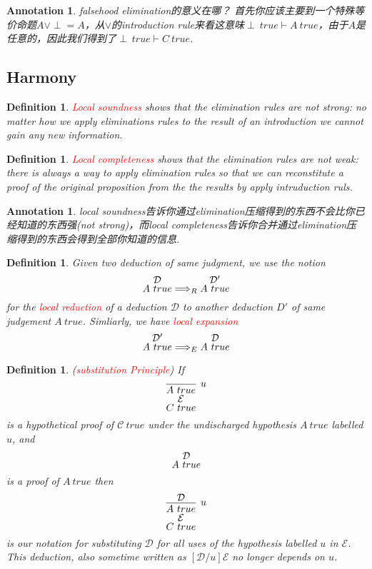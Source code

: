 \documentclass{article}
\theoremstyle{plain}
\newtheorem{definition}[theorem]{Definition}
\newtheorem{annotation}[theorem]{Annotation}
\theoremstyle{nonumberplain}
\newcommand{\redt}[1]{\textcolor{red}{#1}}
\begin{document}
\begin{annotation}
\rm falsehood elimination的意义在哪？ 首先你应该主要到一个特殊等价命题$A \vee \perp = A$，从$\vee$的introduction rule来看这意味$\perp~true \vdash A~true$，由于$A$是任意的，因此我们得到了$\perp~true \vdash C~true$. 
\end{annotation}

\newpage
\subsection{Harmony}

\begin{definition}
\rm \redt{Local soundness} shows that the elimination rules are not strong: no matter how we apply eliminations rules to the result of an introduction we cannot gain any new information.
\end{definition}

\begin{definition}
\rm \redt{Local completeness} shows that the elimination rules are not weak: there is always a way to apply elimination rules so that we can reconstitute a proof of the original proposition from the the results by apply intruduction ruls. 
\end{definition}

\begin{annotation}
\rm local soundness告诉你通过elimination压缩得到的东西不会比你已经知道的东西强(not strong)，而local completeness告诉你合并通过elimination压缩得到的东西会得到全部你知道的信息. 
\end{annotation}


\begin{definition}
\rm Given two deduction of same judgment, we use the notion
$$
\deduce{A~true}{\mathcal{D}} \Longrightarrow_{R} \deduce{A~true}{\mathcal{D'}} 
$$
for the \redt{local reduction} of a deduction $\mathcal{D}$ to another deduction $D'$ of same judgement $A~true$. Simliarly, we have \redt{local expansion}
$$
\deduce{A~true}{\mathcal{D}'} \Longrightarrow_{E} \deduce{A~true}{\mathcal{D}}
$$
\end{definition}


\begin{definition}
\rm (\redt{substitution Principle}) If 
$$
\deduce[\mathcal{E}]{C~true}{\infer[u]{A~true}{}}
$$
is a hypothetical proof of $\mathcal{C}~true$ under the undischarged hypothesis $A~true$ labelled $u$, and 
$$
\deduce{A~true}{\mathcal{D}}
$$
is a proof of $A~true$ then
$$
\deduce[\mathcal{E}]{C~true}{\infer[u]{A~true}{\mathcal{D}}}
$$
is our notation for substituting $\mathcal{D}$ for all uses of the hypothesis labelled $u$ in $\mathcal{E}$. This deduction, also sometime written as $[\mathcal{D}/u]\mathcal{E}$ no longer depends on $u$.  
\end{definition}
\end{document}
